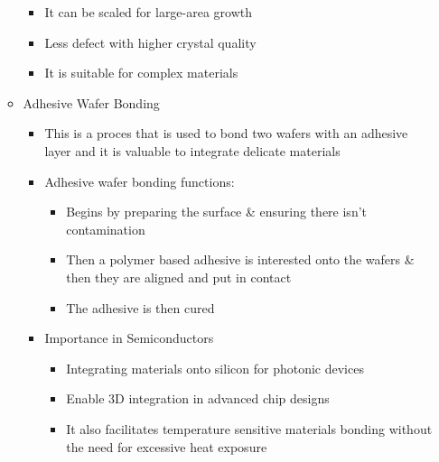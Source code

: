 \documentclass[conference]{IEEEtran}
\begin{document}
\begin{itemize}
\begin{itemize}
\begin{itemize}
          \item It can be scaled for large-area growth 
            
          \item Less defect with higher crystal quality

          \item It is suitable for complex materials 

        \end{itemize}

      \item Adhesive Wafer Bonding 

        \begin{itemize}

          \item This is a proces that is used to bond two wafers with an adhesive layer and it is valuable to integrate delicate materials 

          \item Adhesive wafer bonding functions: 

            \begin{itemize}

              \item Begins by preparing the surface & ensuring there isn’t contamination 

              \item Then a polymer based adhesive is interested onto the wafers & then they are aligned and put in contact 

              \item The adhesive is then cured 

            \end{itemize}

          \item Importance in Semiconductors 

            \begin{itemize}

              \item Integrating materials onto silicon for photonic devices 

              \item Enable 3D integration in advanced chip designs 

              \item It also facilitates temperature sensitive materials bonding without the need for excessive heat exposure 

            \end{itemize}


\end{itemize}
\end{itemize}
\end{itemize}
\end{document}
